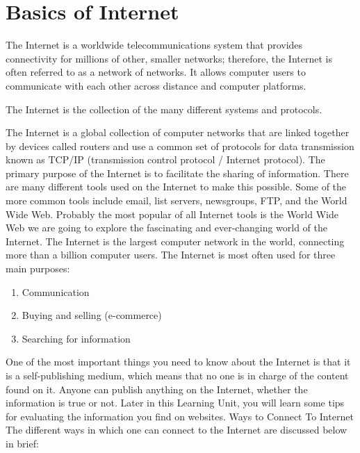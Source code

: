 \documentclass[11pt,a4paper,twoside]{article}
\begin{document}
\part{Basics of Internet}
The Internet is a worldwide telecommunications system that provides connectivity for millions of other, smaller networks; therefore, the Internet is often referred to as a network of networks. It allows computer users to communicate with each other across distance and computer platforms.\par
The Internet is the collection of the many different systems and protocols.\par
The Internet is a global collection of computer networks that are linked together by devices called routers and use a common set of protocols for data transmission known as TCP/IP (transmission control protocol / Internet protocol). The primary purpose of the Internet is to facilitate the sharing of information. There are many different tools used on the Internet to make this possible. Some of the more common tools include email, list servers, newsgroups, FTP, and the World Wide Web. Probably the most popular of all Internet tools is the World Wide Web we are going to explore the fascinating and ever-changing world of the Internet. The Internet is the largest computer network in the world, connecting more than a billion computer users. The Internet is most often used for three main purposes:
\begin{enumerate}
\item Communication
\item Buying and selling (e-commerce)
\item Searching for information
\end{enumerate}
One of the most important things you need to know about the Internet is that it is a self-publishing medium, which means that no one is in charge of the content found on it. Anyone can publish anything on the Internet, whether the information is true or not. Later in this Learning Unit, you will learn some tips for evaluating the information you find on websites.
Ways to Connect To Internet\\
The different ways in which one can connect to the Internet are discussed below in brief:
\end{document}
